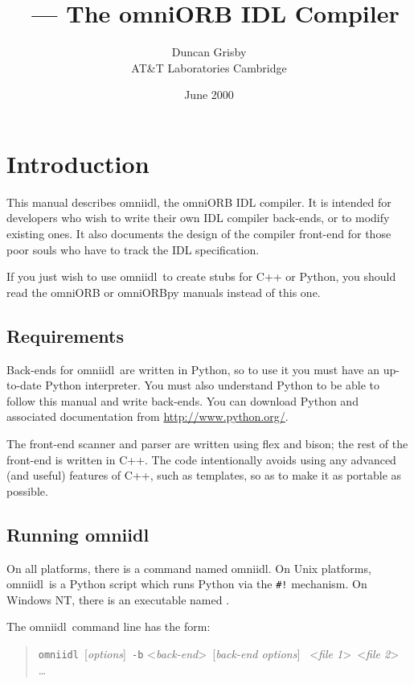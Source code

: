 \documentclass[11pt,twoside,a4paper]{article}
\title{\omniidl\ --- The omniORB IDL Compiler}
\author{Duncan Grisby\\
AT\&T Laboratories Cambridge\\
}
\date{June 2000}
\newcommand{\omniidl}{\textsf{omniidl}}
\newcommand{\cmdline}[1]{\texttt{#1}}
\newcommand{\weburl}{\url}
\newcommand{\file}{\begingroup \urlstyle{tt}\Url}
\begin{document}
\maketitle


\section{Introduction}

This manual describes \omniidl, the omniORB IDL compiler. It is
intended for developers who wish to write their own IDL compiler
back-ends, or to modify existing ones. It also documents the design of
the compiler front-end for those poor souls who have to track the IDL
specification.

If you just wish to use \omniidl\ to create stubs for C++ or Python,
you should read the omniORB or omniORBpy manuals instead of this one.


\subsection{Requirements}

Back-ends for \omniidl\ are written in Python, so to use it you must
have an up-to-date Python interpreter. You must also understand Python
to be able to follow this manual and write back-ends. You can download
Python and associated documentation from
\weburl{http://www.python.org/}.

The front-end scanner and parser are written using flex and bison; the
rest of the front-end is written in C++. The code intentionally avoids
using any advanced (and useful) features of C++, such as templates, so
as to make it as portable as possible.


\subsection{Running \omniidl}

On all platforms, there is a command named \omniidl. On Unix
platforms, \omniidl\ is a Python script which runs Python via the
\verb|#!| mechanism. On Windows NT, there is an executable named
\file{omniidl.exe}.

The \omniidl\ command line has the form:

\begin{quote} %
\cmdline{omniidl }[\textit{options}]\cmdline{ -b}%
<\textit{back-end}>\cmdline{ }[\textit{back-end options}]%
\cmdline{ }<\textit{file 1}>\cmdline{ }<\textit{file 2}>%
\cmdline{ }\dots
\end{quote}
\end{document}
